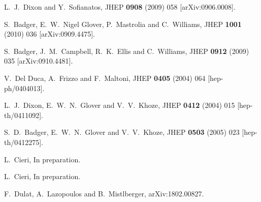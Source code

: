 \documentclass[12pt]{article}
\begin{document}
\begin{thebibliography}{99}
  L.~J.~Dixon and Y.~Sofianatos,
  JHEP {\bf 0908} (2009) 058
   [arXiv:0906.0008].


  S.~Badger, E.~W.~Nigel Glover, P.~Mastrolia and C.~Williams,
  JHEP {\bf 1001} (2010) 036
   [arXiv:0909.4475].


  S.~Badger, J.~M.~Campbell, R.~K.~Ellis and C.~Williams,
  JHEP {\bf 0912} (2009) 035
  [arXiv:0910.4481].



  V.~Del Duca, A.~Frizzo and F.~Maltoni,
  JHEP {\bf 0405} (2004) 064
  [hep-ph/0404013].

  L.~J.~Dixon, E.~W.~N.~Glover and V.~V.~Khoze,
  JHEP {\bf 0412} (2004) 015
  [hep-th/0411092].


  S.~D.~Badger, E.~W.~N.~Glover and V.~V.~Khoze,
  JHEP {\bf 0503} (2005) 023
  [hep-th/0412275].


L.~Cieri, In preparation. 


L.~Cieri, In preparation. 

  F.~Dulat, A.~Lazopoulos and B.~Mistlberger,
  arXiv:1802.00827.
  


\end{thebibliography}
\end{document}
